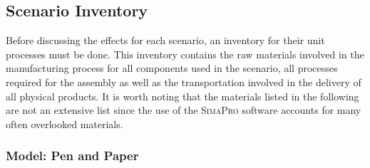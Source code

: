 \subsection{Scenario Inventory}\label{subsec:inventory}
Before discussing the effects for each scenario, an inventory for their unit processes must be done. This inventory contains the raw materials involved in the manufacturing process for all components used in the scenario, all processes required for the assembly as well as the transportation involved in the delivery of all physical products. It is worth noting that the materials listed in the following are not an extensive list since the use of the \textsc{SimaPro} software accounts for many often overlooked materials.

\subsubsection{Model: Pen and Paper}\label{subsubsec:model_pen_paper}

